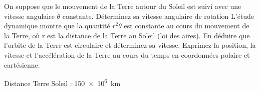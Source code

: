 \begin{Exercise}[title=Rotation de la Terre]
	\Question On suppose que le mouvement de la Terre autour du Soleil est suivi avec une vitesse angulaire $\dot{\theta}$ constante. Déterminez sa vitesse angulaire de rotation
	\Question L'étude dynamique montre que la quantité
	$r^2\theta$ est	constante au cours du mouvement de la Terre, où r est la distance de la Terre au Soleil (loi des aires).
	 En déduire que l'orbite de la Terre est circulaire et déterminez sa vitesse.
	\Question Exprimez la position, la vitesse et l'accélération de la Terre au cours du temps en coordonnées polaire et
	cartésienne.
\end{Exercise}
\begin{Answer}
	Distance Terre Soleil : \SI{150e6}{km}
\end{Answer}
